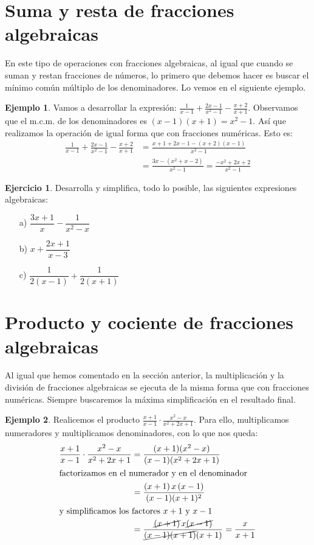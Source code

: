 \documentclass[13pt]{scrartcl}
\theoremstyle{definition}
\newtheorem{ejemplo}{Ejemplo}
\newtheorem{ejercicio}{Ejercicio}
\begin{document}
\section{Suma y resta de fracciones algebraicas}

En este tipo de operaciones con fracciones algebraicas, al igual que cuando se suman y 
restan fracciones de números, lo primero que debemos hacer es buscar el mínimo común 
múltiplo de los denominadores. Lo vemos en el siguiente ejemplo. 

\begin{ejemplo}
Vamos a 
desarrollar la expresión: $\frac{1}{x-1}+\frac{2x-1}{x^2-1}-\frac{x+2}{x+1}$. 
Observamos que el m.c.m. de los denominadores es $(x-1)(x+1)=x^2-1$. Así que realizamos 
la operación de igual forma que con fracciones numéricas. Esto es:
\begin{align*}
\frac{1}{x-1}+\frac{2x-1}{x^2-1}-\frac{x+2}{x+1}&= \frac{x+1+2x-1-(x+2)(x-1)}{x^2-1}\\
&= \frac{3x-(x^2+x-2)}{x^2-1}=\frac{-x^2+2x+2}{x^2-1}
\end{align*}
\end{ejemplo}

\pagebreak[4]

\begin{ejercicio} Desarrolla y simplifica, todo lo posible, las siguientes expresiones  algebraicas:
\begin{multicols}{3}
\begin{enumerate}
\item[a)]$\dfrac{3x+1}{x}-\dfrac{1}{x^2-x}$
\item[b)]$x+\dfrac{2x+1}{x-3}$
\item[c)]$\dfrac{1}{2(x-1)}+\dfrac{1}{2(x+1)}$
\end{enumerate}
\end{multicols}
\end{ejercicio}

\section{Producto y cociente de fracciones algebraicas}

Al igual que hemos comentado en la sección anterior, la multiplicación y la división de fracciones 
algebraicas se ejecuta de la misma forma que con fracciones numéricas. Siempre buscaremos 
la máxima simplificación en el resultado final. 

\begin{ejemplo}
Realicemos el producto 
$\frac{x+1}{x-1} \cdot \frac{x^2-x}{x^2+2x+1}$. Para ello, multiplicamos 
numeradores y multiplicamos denominadores, con lo que nos queda:
\begin{align*}
\frac{x+1}{x-1} \cdot \frac{x^2-x}{x^2+2x+1}&=\frac{(x+1)(x^2-x)}{(x-1)(x^2+2x+1)} \\
\intertext{factorizamos en el numerador y en el denominador}
&=\frac{(x+1)\,x\,(x-1)}{(x-1)(x+1)^2} \\
\intertext{y simplificamos los factores $x+1$ y $x-1$}
&=\frac{\cancel{(x+1)} \, x \cancel{(x-1)}}{\cancel{(x-1)(x+1)}(x+1)}= \frac{x}{x+1}
\end{align*}
\end{ejemplo}
\end{document}
